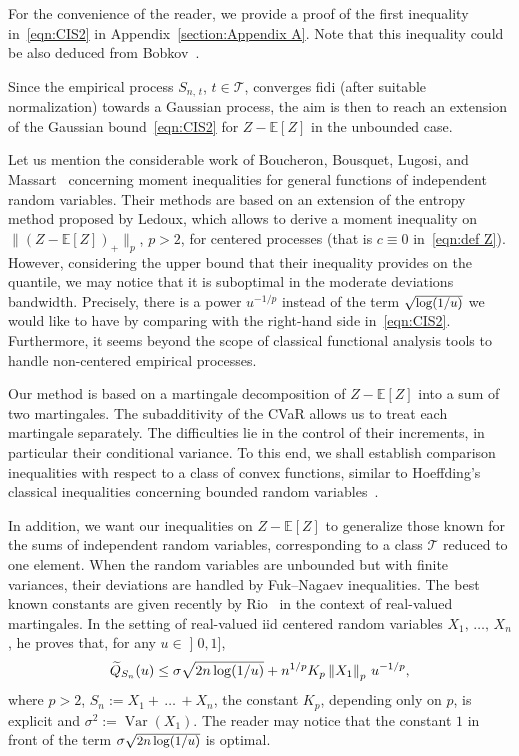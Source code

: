 \documentclass[10pt]{amsart}
\theoremstyle{definition}\newtheorem{defi}[theo]{Definition}\newtheorem{rema}[theo]{Remark}\newtheorem{exam}[theo]{Example}\newtheorem{exem}[theo]{Example}\newtheorem{nota}[theo]{Notation}
\DeclareMathOperator{\Var}{Var}
\newcommand{\bE}{\mathbb{E}}
\newcommand{\cT}{\mathcal{T}}
\newcommand{\intervalleof}[2]{\mathopen{]} #1\mathclose{}\mathpunct{},#2\mathclose{]}}
\let\oldtilde\tilde
\renewcommand*{\tilde}[1]{\mathchoice{\widetilde{#1}}{\widetilde{#1}}{\oldtilde{#1}}{\oldtilde{#1}}}
\begin{document}
For the convenience of the reader, we provide a proof of the first inequality in~\eqref{eqn:CIS2} in Appendix~\ref{section:Appendix A}. Note that this inequality could be also deduced from Bobkov~\cite[Corollary~2]{Bobkov03}.

Since the empirical process $S_{n,\,t}$, $t\in\cT$, converges fidi (after suitable normalization) towards a Gaussian process, the aim is then to reach an extension of the Gaussian bound~\eqref{eqn:CIS2} for $Z-\bE[Z]$ in the unbounded case.

Let us mention the considerable work of Boucheron, Bousquet, Lugosi, and Massart~\cite{BBLM05} concerning moment inequalities for general functions of independent random variables. Their methods are based on an extension of the entropy method proposed by Ledoux, which allows to derive a moment inequality on $\|(Z-\bE[Z])_+\|_p$, $p>2$, for centered processes (that is $c\equiv 0$ in~\eqref{eqn:def Z}). However, considering the upper bound that their inequality provides on the quantile, we may notice that it is suboptimal in the moderate deviations bandwidth. Precisely, there is a power $u^{-1/p}$ instead of the term $\sqrt{\text{\small{$\log(1/u)$}}}$ we would like to have by comparing with the right-hand side in~\eqref{eqn:CIS2}. Furthermore, it seems beyond the scope of classical functional analysis tools to handle non-centered empirical processes.

Our method is based on a martingale decomposition of $Z-\bE[Z]$ into a sum of two martingales. The subadditivity of the CVaR allows us to treat each martingale separately. The difficulties lie in the control of their increments, in particular their conditional variance. To this end, we shall establish comparison inequalities with respect to a class of convex functions, similar to Hoeffding's classical inequalities concerning bounded random variables~\cite{Hoeffding63}.

In addition, we want our inequalities on $Z-\bE[Z]$ to generalize those known for the sums of independent random variables, corresponding to a class $\cT$ reduced to one element. When the random variables are unbounded but with finite variances, their deviations are handled by Fuk--Nagaev inequalities. The best known constants are given recently by Rio~\cite{Rio17a} in the context of real-valued martingales. In the setting of real-valued iid centered random variables $X_1,\,\ldots,\,X_n$, he proves that, for any $u\in\intervalleof 01$,
\begin{equation}\label{eqn:Rio FukNagaev iid}
\tilde Q_{S_n}(u)\leq \sigma\sqrt{2n\log(1/u)}+n^{1/p}K_p \left\|X_1\right\|_{p} \,u^{-1/p},
\end{equation}
where $p>2$, $S_n:=X_1+\,\ldots\,+X_n$, the constant $K_p$, depending only on $p$, is explicit and $\sigma^2:=\Var(X_1)$. The reader may notice that the constant $1$ in front of the term $\sigma\sqrt{\text{\small{$2n\log(1/u)$}}}$ is optimal.
\end{document}
